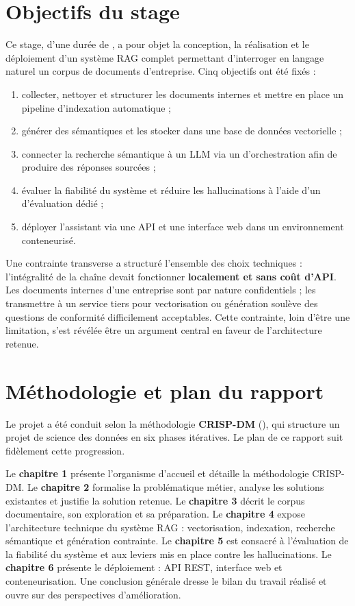 \section*{Objectifs du stage}

Ce stage, d'une durée de \internshipduration, a pour objet la conception, la
réalisation et le déploiement d'un système RAG complet permettant d'interroger
en langage naturel un corpus de documents d'entreprise. Cinq objectifs ont été
fixés :

\begin{enumerate}[label=\textbf{\arabic*.}]
  \item collecter, nettoyer et structurer les documents internes et mettre en
        place un pipeline d'indexation automatique ;
  \item générer des  sémantiques et les stocker dans une base de
        données vectorielle ;
  \item connecter la recherche sémantique à un LLM via un 
        d'orchestration afin de produire des réponses sourcées ;
  \item évaluer la fiabilité du système et réduire les hallucinations à l'aide
        d'un  d'évaluation dédié ;
  \item déployer l'assistant via une API et une interface web dans un
        environnement conteneurisé.
\end{enumerate}

Une contrainte transverse a structuré l'ensemble des choix techniques :
l'intégralité de la chaîne devait fonctionner \textbf{localement et sans coût
d'API}. Les documents internes d'une entreprise sont par nature confidentiels ;
les transmettre à un service tiers pour vectorisation ou génération soulève des
questions de conformité difficilement acceptables. Cette contrainte, loin d'être
une limitation, s'est révélée être un argument central en faveur de
l'architecture retenue.

\section*{Méthodologie et plan du rapport}

Le projet a été conduit selon la méthodologie \textbf{CRISP-DM}
(), qui structure un projet
de science des données en six phases itératives. Le plan de ce rapport suit
fidèlement cette progression.

Le \textbf{chapitre 1} présente l'organisme d'accueil et détaille la
méthodologie CRISP-DM. Le \textbf{chapitre 2} formalise la problématique
métier, analyse les solutions existantes et justifie la solution retenue. Le
\textbf{chapitre 3} décrit le corpus documentaire, son exploration et sa
préparation. Le \textbf{chapitre 4} expose l'architecture technique du système
RAG : vectorisation, indexation, recherche sémantique et génération contrainte.
Le \textbf{chapitre 5} est consacré à l'évaluation de la fiabilité du système et
aux leviers mis en place contre les hallucinations. Le \textbf{chapitre 6}
présente le déploiement : API REST, interface web et conteneurisation. Une
conclusion générale dresse le bilan du travail réalisé et ouvre sur des
perspectives d'amélioration.
